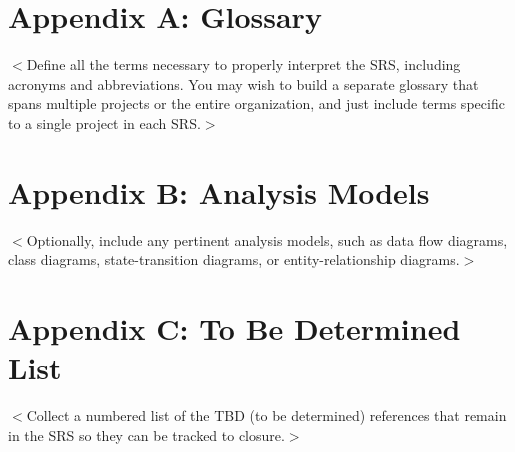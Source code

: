 \documentclass{scrreprt}
\begin{document}
\section{Appendix A: Glossary}
$<$Define all the terms necessary to properly interpret the SRS, including 
acronyms and abbreviations. You may wish to build a separate glossary that spans 
multiple projects or the entire organization, and just include terms specific to 
a single project in each SRS.$>$

\section{Appendix B: Analysis Models}
$<$Optionally, include any pertinent analysis models, such as data flow 
diagrams, class diagrams, state-transition diagrams, or entity-relationship 
diagrams.$>$

\section{Appendix C: To Be Determined List}
$<$Collect a numbered list of the TBD (to be determined) references that remain 
in the SRS so they can be tracked to closure.$>$
\end{document}
